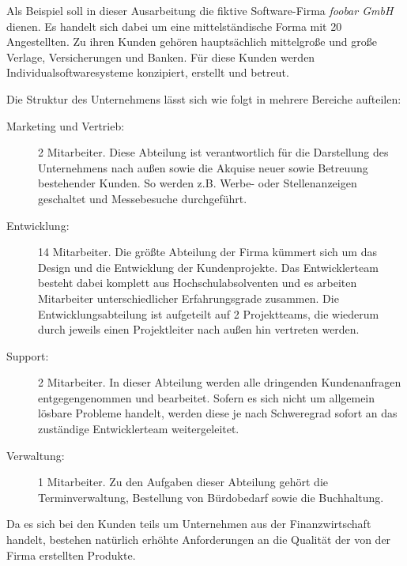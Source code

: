 Als Beispiel soll in dieser Ausarbeitung die fiktive Software-Firma 
\emph{foobar GmbH} dienen. Es handelt sich dabei um eine mittelständische Forma 
mit 20 Angestellten. Zu ihren Kunden gehören hauptsächlich mittelgroße und große
Verlage, Versicherungen und Banken. Für diese Kunden werden
Individualsoftwaresysteme konzipiert, erstellt und betreut.

Die Struktur des Unternehmens lässt sich wie folgt in mehrere Bereiche
aufteilen: 

\begin{description}
  \item[Marketing und Vertrieb:] 2 Mitarbeiter. Diese Abteilung ist
  verantwortlich für die Darstellung des Unternehmens nach außen sowie die
  Akquise neuer sowie Betreuung bestehender Kunden. So werden z.B. Werbe- oder
  Stellenanzeigen geschaltet und Messebesuche durchgeführt.
  \item[Entwicklung:] 14 Mitarbeiter. Die größte Abteilung der Firma kümmert
  sich um das Design und die Entwicklung der Kundenprojekte. Das Entwicklerteam
  besteht dabei komplett aus Hochschulabsolventen und es arbeiten Mitarbeiter
  unterschiedlicher Erfahrungsgrade zusammen. Die Entwicklungsabteilung ist
  aufgeteilt auf 2 Projektteams, die wiederum durch jeweils einen Projektleiter
  nach außen hin vertreten werden.
  \item[Support:] 2 Mitarbeiter. In dieser Abteilung werden alle dringenden
  Kundenanfragen entgegengenommen und bearbeitet. Sofern es sich nicht um
  allgemein lösbare Probleme handelt, werden diese je nach Schweregrad sofort an
  das zuständige Entwicklerteam weitergeleitet.
  \item[Verwaltung:] 1 Mitarbeiter. Zu den Aufgaben dieser Abteilung gehört die
  Terminverwaltung, Bestellung von Bürdobedarf sowie die Buchhaltung.
\end{description}

Da es sich bei den Kunden teils um Unternehmen aus der Finanzwirtschaft 
handelt, bestehen natürlich erhöhte Anforderungen an die Qualität der von der 
Firma erstellten Produkte.